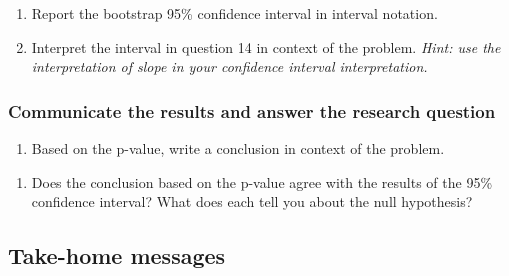\documentclass[
]{report}
\providecommand{\tightlist}{%
  \setlength{\itemsep}{0pt}\setlength{\parskip}{0pt}}
\begin{document}
\begin{enumerate}
\def\labelenumi{\arabic{enumi}.}
\setcounter{enumi}{13}
\item
  Report the bootstrap 95\% confidence interval in interval notation.\\
  \vspace{0.5in}
\item
  Interpret the interval in question 14 in context of the problem. \emph{Hint: use the interpretation of slope in your confidence interval interpretation.}
\end{enumerate}

\vspace{0.8in}

\hypertarget{communicate-the-results-and-answer-the-research-question-4}{%
\subsubsection*{Communicate the results and answer the research question}\label{communicate-the-results-and-answer-the-research-question-4}}

\begin{enumerate}
\def\labelenumi{\arabic{enumi}.}
\setcounter{enumi}{15}
\tightlist
\item
  Based on the p-value, write a conclusion in context of the problem.
\end{enumerate}

\vspace{.8in}

\begin{enumerate}
\def\labelenumi{\arabic{enumi}.}
\setcounter{enumi}{16}
\tightlist
\item
  Does the conclusion based on the p-value agree with the results of the 95\% confidence interval? What does each tell you about the null hypothesis?
\end{enumerate}

\vspace{.6in}
\newpage

\hypertarget{take-home-messages-20}{%
\subsection{Take-home messages}\label{take-home-messages-20}}
\end{document}
